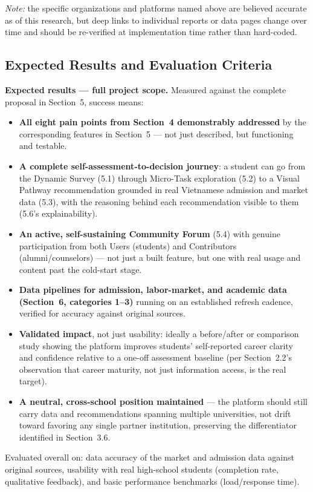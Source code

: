 \documentclass[a4paper]{article}
\begin{document}
\noindent
\textit{Note:} the specific organizations and platforms named above are believed accurate as of
this research, but deep links to individual reports or data pages change over time and should be
re-verified at implementation time rather than hard-coded.

\subsection{Expected Results and Evaluation Criteria}

\textbf{Expected results --- full project scope.} Measured against the complete proposal in
Section~5, success means:

\begin{itemize}
    \item \textbf{All eight pain points from Section~4 demonstrably addressed} by the
    corresponding features in Section~5 --- not just described, but functioning and testable.
    \item \textbf{A complete self-assessment-to-decision journey}: a student can go from the
    Dynamic Survey (5.1) through Micro-Task exploration (5.2) to a Visual Pathway
    recommendation grounded in real Vietnamese admission and market data (5.3), with the
    reasoning behind each recommendation visible to them (5.6's explainability).
    \item \textbf{An active, self-sustaining Community Forum} (5.4) with genuine participation
    from both Users (students) and Contributors (alumni/counselors) --- not just a built
    feature, but one with real usage and content past the cold-start stage.
    \item \textbf{Data pipelines for admission, labor-market, and academic data (Section~6,
    categories 1--3)} running on an established refresh cadence, verified for accuracy against
    original sources.
    \item \textbf{Validated impact}, not just usability: ideally a before/after or comparison
    study showing the platform improves students' self-reported career clarity and confidence
    relative to a one-off assessment baseline (per Section~2.2's observation that career
    maturity, not just information access, is the real target).
    \item \textbf{A neutral, cross-school position maintained} --- the platform should still
    carry data and recommendations spanning multiple universities, not drift toward favoring
    any single partner institution, preserving the differentiator identified in Section~3.6.
\end{itemize}

Evaluated overall on: data accuracy of the market and admission data against original sources,
usability with real high-school students (completion rate, qualitative feedback), and basic
performance benchmarks (load/response time).
\end{document}
